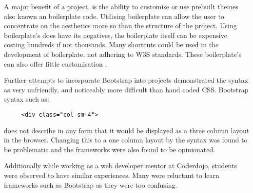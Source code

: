\newpage

A major benefit of a project, is the ability to customise or use prebuilt themes also known an boilerplate code. Utilising boilerplate can allow the user to concentrate on the aesthetics more so than the structure of the project. Using boilerplate's does have its negatives, the boilerplate itself can be expensive costing hundreds if not thousands. Many shortcuts could be used in the development of boilerplate, not adhering to W3S standards. These boilerplate's can also offer little customisation \citep{NATH16}.

Further attempts to incorporate Bootstrap into projects demonstrated the syntax as very unfriendly, and noticeably more difficult than hand coded CSS. Bootstrap syntax such as: \begin{lstlisting}
	 <div class="col-sm-4">\end{lstlisting} 
	 does not describe in any form that it would be displayed as a three column layout in the browser. Changing this to a one column layout by the syntax was found to be problematic and the frameworks were also found to be opinionated.  
	 
Additionally while working as a web developer mentor at Coderdojo, students were observed to have similar experiences. Many were reluctant to learn frameworks such as Bootstrap as they were too confusing.

%